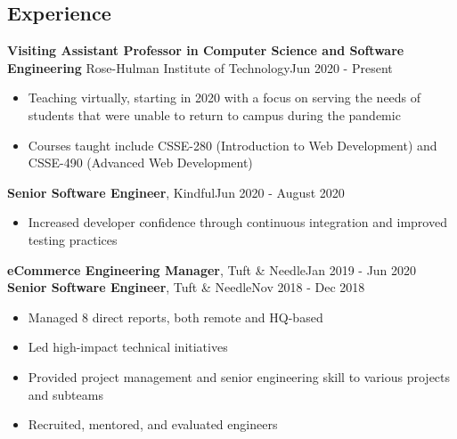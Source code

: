\documentclass[line, margin, 10pt]{res}
\begin{document}
\renewcommand{\namefont}{ \LARGE \bf }

\address{eliza@elizamarcum.com}
\address{elizamarcum.com}

\begin{resume}
\section{Experience}


{\bf Visiting Assistant Professor in Computer Science and Software Engineering} Rose-Hulman Institute of Technology\hfill Jun 2020 - Present
\begin{itemize} \itemsep -2pt  %
  \item Teaching virtually, starting in 2020 with a focus on serving the needs of students that were unable to return to campus during the pandemic
  \item Courses taught include CSSE-280 (Introduction to Web Development) and CSSE-490 (Advanced Web Development)
\end{itemize}

{\bf Senior Software Engineer}, Kindful\hfill Jun 2020 - August 2020
\begin{itemize} \itemsep -2pt  %
  \item Increased developer confidence through continuous integration and improved testing practices
\end{itemize}

{\bf eCommerce Engineering Manager}, Tuft \& Needle\hfill Jan 2019 - Jun 2020\\
{\bf Senior Software Engineer}, Tuft \& Needle\hfill Nov 2018 - Dec 2018
\begin{itemize} \itemsep -2pt  %
  \item Managed 8 direct reports, both remote and HQ-based
  \item Led high-impact technical initiatives
  \item Provided project management and senior engineering skill to various projects and subteams
  \item Recruited, mentored, and evaluated engineers
\end{itemize}


\end{resume}
\end{document}
